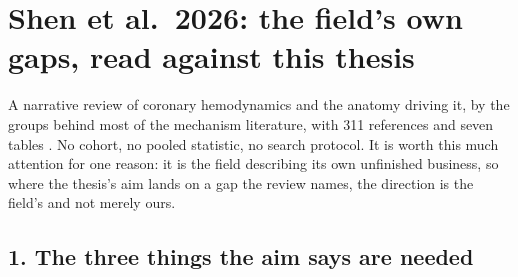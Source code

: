 %
%

\section*{Shen et al.\ 2026: the field's own gaps, read against this thesis}

A narrative review of coronary hemodynamics and the anatomy driving it, by the groups behind most
of the mechanism literature, with 311 references and seven tables \cite{shen2026geometry}.
No cohort, no pooled statistic, no search protocol.
It is worth this much attention for one reason: it is the field describing its own unfinished
business, so where the thesis's aim lands on a gap the review names, the direction is the field's
and not merely ours.

\subsection*{1. The three things the aim says are needed}

